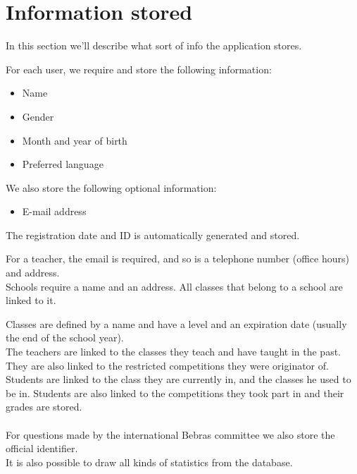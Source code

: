 
\section{Information stored}
In this section we'll describe what sort of info the application stores.

For each user, we require and store the following information:\\
\begin{itemize}
\item Name
\item Gender
\item Month and year of birth
\item Preferred language
\end{itemize} 


We also store the following optional information:
\begin{itemize}
\item E-mail address
\end{itemize}


The registration date and ID is automatically generated and stored.

For a teacher, the email is required, and so is a telephone number (office hours) and address.
\\
Schools require a name and an address. All classes that belong to a school are linked to it.

Classes are defined by a name and have a level and an expiration date (usually the end of the school year). \\

The teachers are linked to the classes they teach and have taught in the past. They are also linked to the restricted competitions they were originator of. Students are linked to the class they are currently in, and the classes he used to be in. Students are also linked to the competitions they took part in and their grades are stored. 
\\ \\
For questions made by the international Bebras committee we also store the official identifier.\\
It is also possible to draw all kinds of statistics from the database.
